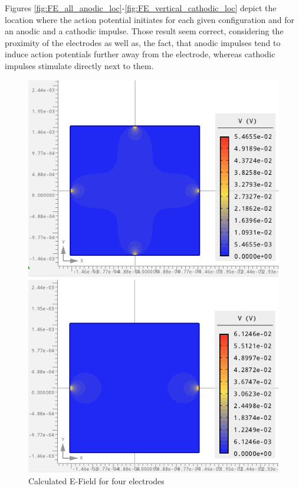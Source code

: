 \documentclass{article}
\begin{document}
    Figures \ref{fig:FE_all_anodic_loc}-\ref{fig:FE_vertical_cathodic_loc} depict the location where the action potential initiates for each given configuration and for an anodic and a cathodic impulse.
    Those result seem correct, considering the proximity of the electrodes as well as, the fact, that anodic impulses tend to induce action potentials further away from the electrode, whereas cathodic impulses stimulate directly next to them.

    \begin{figure}[htbp]
        \centering
        \begin{minipage}[b]{0.3\textwidth}
            \includegraphics[width=\textwidth]{FE_efield_1}
            \caption{Calculated E-Field for four electrodes}
            \label{fig:FE_efield_1_1}
        \end{minipage}
        \hfill
        \begin{minipage}[b]{0.3\textwidth}
            \includegraphics[width=\textwidth]{FE_efield_horizontal}

\end{minipage}
\end{figure}
\end{document}

